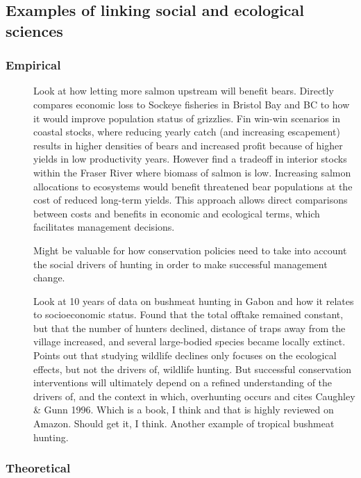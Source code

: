 \documentclass[a4paper,10pt]{report}
\begin{document}
\subsection{Examples of linking social and ecological sciences}
\subsubsection{Empirical}
\begin{description}
\item[\cite{Levietal:2012}] Look at how letting more salmon upstream will benefit bears. Directly compares economic loss to Sockeye fisheries in Bristol Bay and BC to how it would improve population status of grizzlies. Fin win-win scenarios in coastal stocks, where reducing yearly catch (and increasing escapement) results in higher densities of bears and increased profit because of higher yields in low productivity years. However find a tradeoff in interior stocks within the Fraser River where biomass of salmon is low. Increasing salmon allocations to ecosystems would benefit threatened bear populations at the cost of reduced long-term yields. This approach allows direct comparisons between costs and benefits in economic and ecological terms, which facilitates management decisions. 

Might be valuable for how conservation policies need to take into account the social drivers of hunting in order to make successful management change. 
\item[\cite{Coadetal:2013}] Look at 10 years of data on  bushmeat hunting in Gabon and how it relates to socioeconomic status. Found that the total offtake remained constant, but that the number of hunters declined, distance of traps away from the village increased, and several large-bodied species became locally extinct. Points out that studying wildlife declines only focuses on the ecological effects, but not the drivers of, wildlife hunting. But successful conservation interventions will ultimately depend on a refined understanding of the drivers of, and the context in which, overhunting occurs and cites Caughley \& Gunn 1996. Which is a book, I think and that is highly reviewed on Amazon. Should get it, I think.  Another example of tropical bushmeat hunting. 
\end{description}

\subsubsection{Theoretical}
\end{document}
